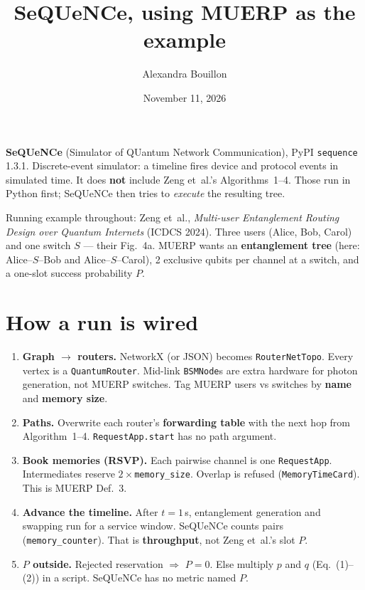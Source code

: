 \documentclass[11pt]{article}
\title{SeQUeNCe, using MUERP as the example}
\author{Alexandra Bouillon}
\date{November 11, 2026}
\begin{document}
\maketitle

\textbf{SeQUeNCe} (Simulator of QUantum Network Communication), PyPI \texttt{sequence} 1.3.1.
Discrete-event simulator: a timeline fires device and protocol events in simulated time.
It does \textbf{not} include Zeng et~al.'s Algorithms~1--4.
Those run in Python first; SeQUeNCe then tries to \emph{execute} the resulting tree.

Running example throughout: Zeng et~al., \emph{Multi-user Entanglement Routing Design over Quantum Internets} (ICDCS 2024).
Three users (Alice, Bob, Carol) and one switch $S$ --- their Fig.~4a.
MUERP wants an \textbf{entanglement tree} (here: Alice--$S$--Bob and Alice--$S$--Carol), 2 exclusive qubits per channel at a switch, and a one-slot success probability $P$.

\section{How a run is wired}

\begin{enumerate}
\item \textbf{Graph $\to$ routers.}
NetworkX (or JSON) becomes \texttt{RouterNetTopo}.
Every vertex is a \texttt{QuantumRouter}.
Mid-link \texttt{BSMNode}s are extra hardware for photon generation, not MUERP switches.
Tag MUERP users vs switches by \textbf{name} and \textbf{memory size}.
\item \textbf{Paths.}
Overwrite each router's \textbf{forwarding table} with the next hop from Algorithm~1--4.
\texttt{RequestApp.start} has no path argument.
\item \textbf{Book memories (RSVP).}
Each pairwise channel is one \texttt{RequestApp}.
Intermediates reserve $2\times$\texttt{memory\_size}.
Overlap is refused (\texttt{MemoryTimeCard}).
This is MUERP Def.~3.
\item \textbf{Advance the timeline.}
After $t=1$\,s, entanglement generation and swapping run for a service window.
SeQUeNCe counts pairs (\texttt{memory\_counter}).
That is \textbf{throughput}, not Zeng et~al.'s slot $P$.
\item \textbf{$P$ outside.}
Rejected reservation $\Rightarrow$ $P=0$.
Else multiply $p$ and $q$ (Eq.~(1)--(2)) in a script.
SeQUeNCe has no metric named $P$.
\end{enumerate}
\end{document}
